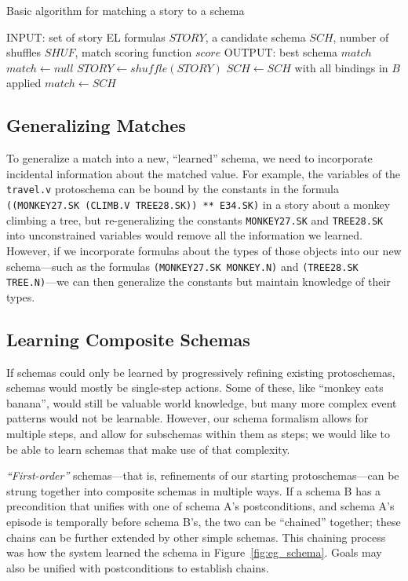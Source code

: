 \begin{algorithm}
\caption{Basic algorithm for matching a story to a schema}
\label{alg:matching}
\begin{algorithmic}
\STATE INPUT: set of story EL formulas $STORY$, a candidate schema $SCH$, number of shuffles $SHUF$, match scoring function $score$
\STATE OUTPUT: best schema $match$
\STATE $match \gets null$
    \STATE $STORY \gets shuffle(STORY)$
                \STATE $SCH \gets SCH$ with all bindings in $B$ applied
            \ENDIF
        \ENDFOR
    \ENDFOR
        \STATE $match \gets SCH$
    \ENDIF
\ENDFOR
\end{algorithmic}
\end{algorithm}

\subsection{Generalizing Matches}
To generalize a match into a new, ``learned'' schema, we need to incorporate incidental information about the matched value. For example, the variables of the \texttt{travel.v} protoschema can be bound by the constants in the formula \texttt{((MONKEY27.SK (CLIMB.V TREE28.SK)) ** E34.SK)} in a story about a monkey climbing a tree, but re-generalizing the constants \texttt{MONKEY27.SK} and \texttt{TREE28.SK} into unconstrained variables would remove all the information we learned. However, if we incorporate formulas about the types of those objects into our new schema---such as the formulas \texttt{(MONKEY27.SK MONKEY.N)} and \texttt{(TREE28.SK TREE.N)}---we can then generalize the constants but maintain knowledge of their types.

\subsection{Learning Composite Schemas}
If schemas could only be learned by progressively refining existing protoschemas, schemas would mostly be single-step actions. Some of these, like ``monkey eats banana'', would still be valuable world knowledge, but many more complex event patterns would not be learnable. However, our schema formalism allows for multiple steps, and allow for subschemas within them as steps; we would like to be able to learn schemas that make use of that complexity.

\textit{``First-order''} schemas---that is, refinements of our starting protoschemas---can be strung together into composite schemas in multiple ways. If a schema B has a precondition that unifies with one of schema A's postconditions, and schema A's episode is temporally before schema B's, the two can be ``chained'' together; these chains can be further extended by other simple schemas. This chaining process was how the system learned the schema in Figure~\ref{fig:eg_schema}. Goals may also be unified with postconditions to establish chains.
